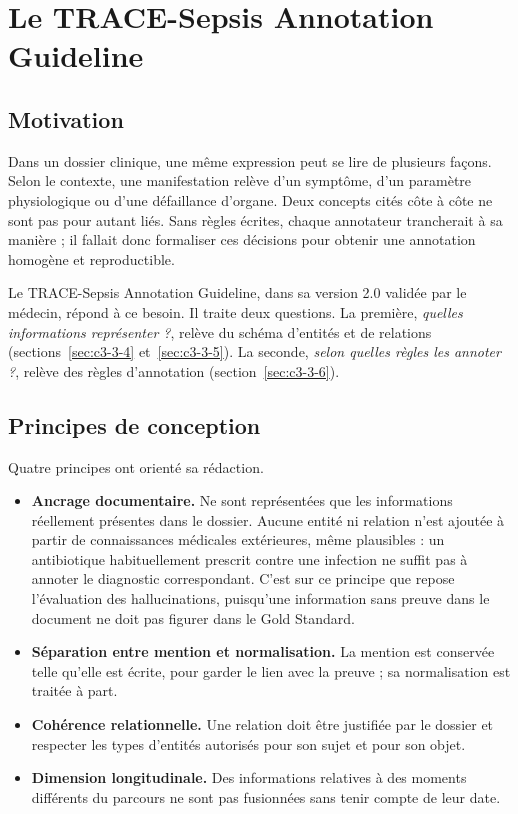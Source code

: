 \section{Le TRACE-Sepsis Annotation Guideline}\label{sec:c3-3-3}

\subsection{Motivation}\label{sec:c3-3-3-1}

Dans un dossier clinique, une même expression peut se lire de plusieurs façons. Selon le contexte, une manifestation relève d’un symptôme, d’un paramètre physiologique ou d’une défaillance d’organe. Deux concepts cités côte à côte ne sont pas pour autant liés. Sans règles écrites, chaque annotateur trancherait à sa manière ; il fallait donc formaliser ces décisions pour obtenir une annotation homogène et reproductible.

Le TRACE-Sepsis Annotation Guideline, dans sa version 2.0 validée par le médecin, répond à ce besoin. Il traite deux questions. La première, \emph{quelles informations représenter ?}, relève du schéma d’entités et de relations (sections~\ref{sec:c3-3-4} et~\ref{sec:c3-3-5}). La seconde, \emph{selon quelles règles les annoter ?}, relève des règles d’annotation (section~\ref{sec:c3-3-6}).

\subsection{Principes de conception}\label{sec:c3-3-3-2}

Quatre principes ont orienté sa rédaction.

\begin{itemize}
  \item \textbf{Ancrage documentaire.} Ne sont représentées que les informations réellement présentes dans le dossier. Aucune entité ni relation n’est ajoutée à partir de connaissances médicales extérieures, même plausibles : un antibiotique habituellement prescrit contre une infection ne suffit pas à annoter le diagnostic correspondant. C’est sur ce principe que repose l’évaluation des hallucinations, puisqu’une information sans preuve dans le document ne doit pas figurer dans le Gold Standard.
  \item \textbf{Séparation entre mention et normalisation.} La mention est conservée telle qu’elle est écrite, pour garder le lien avec la preuve ; sa normalisation est traitée à part.
  \item \textbf{Cohérence relationnelle.} Une relation doit être justifiée par le dossier et respecter les types d’entités autorisés pour son sujet et pour son objet.
  \item \textbf{Dimension longitudinale.} Des informations relatives à des moments différents du parcours ne sont pas fusionnées sans tenir compte de leur date.
\end{itemize}

